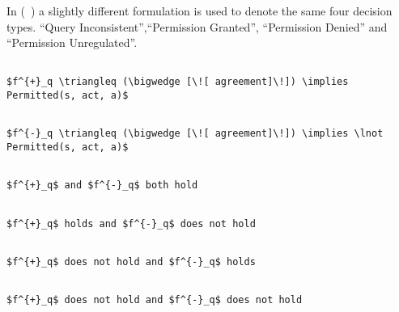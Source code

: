 In (~\cite{pucella2006}) a slightly different formulation is used to denote the same four decision types. ``Query Inconsistent'',``Permission Granted'', ``Permission Denied'' and ``Permission Unregulated''. 

\lstset{mathescape, language=AST} 
\begin{lstlisting}[frame=single, caption={$f^{+}_q$},label={lst:fplusformula}]

$f^{+}_q \triangleq (\bigwedge [\![ agreement]\!]) \implies Permitted(s, act, a)$ 

\end{lstlisting}

\lstset{mathescape, language=AST} 
\begin{lstlisting}[frame=single, caption={$f^{-}_q$},label={lst:fminusformula}]

$f^{-}_q \triangleq (\bigwedge [\![ agreement]\!]) \implies \lnot Permitted(s, act, a)$ 

\end{lstlisting}


\lstset{mathescape, language=AST} 
\begin{lstlisting}[frame=single, caption={Answerable Queries: Query Inconsistent},label={lst:queryinconsistentdecision}]

$f^{+}_q$ and $f^{-}_q$ both hold

\end{lstlisting}

\lstset{mathescape, language=AST} 
\begin{lstlisting}[frame=single, caption={Answerable Queries: Permission Granted},label={lst:permission granteddecision}]

$f^{+}_q$ holds and $f^{-}_q$ does not hold

\end{lstlisting}

\lstset{mathescape, language=AST} 
\begin{lstlisting}[frame=single, caption={Answerable Queries: Permission Denied},label={lst:permission denieddecision}]

$f^{+}_q$ does not hold and $f^{-}_q$ holds

\end{lstlisting}

\lstset{mathescape, language=AST} 
\begin{lstlisting}[frame=single, caption={Answerable Queries: Permission Unregulated},label={lst:permission unregulateddecision}]

$f^{+}_q$ does not hold and $f^{-}_q$ does not hold

\end{lstlisting}


























